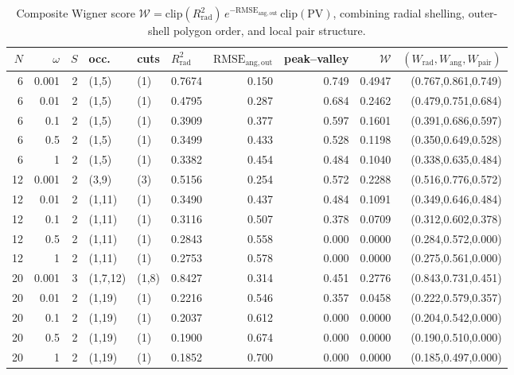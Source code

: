 \begin{table}[t]
\centering
\small
\setlength{\tabcolsep}{3.5pt}
\renewcommand{\arraystretch}{1.12}
\begin{adjustbox}{max width=\textwidth}
\begin{tabular}{rrrlllrrrr}
\toprule
$N$ & $\omega$ & $S$ & occ. & cuts & $R^2_{\mathrm{rad}}$ & $\mathrm{RMSE}_{\mathrm{ang,out}}$ & peak--valley & $\mathcal{W}$ & $(W_{\mathrm{rad}},W_{\mathrm{ang}},W_{\mathrm{pair}})$ \\
\midrule
6 & 0.001 & 2 & (1,5) & (1) & 0.7674 & 0.150 & 0.749 & 0.4947 & (0.767,0.861,0.749) \\
6 & 0.01 & 2 & (1,5) & (1) & 0.4795 & 0.287 & 0.684 & 0.2462 & (0.479,0.751,0.684) \\
6 & 0.1 & 2 & (1,5) & (1) & 0.3909 & 0.377 & 0.597 & 0.1601 & (0.391,0.686,0.597) \\
6 & 0.5 & 2 & (1,5) & (1) & 0.3499 & 0.433 & 0.528 & 0.1198 & (0.350,0.649,0.528) \\
6 & 1 & 2 & (1,5) & (1) & 0.3382 & 0.454 & 0.484 & 0.1040 & (0.338,0.635,0.484) \\
12 & 0.001 & 2 & (3,9) & (3) & 0.5156 & 0.254 & 0.572 & 0.2288 & (0.516,0.776,0.572) \\
12 & 0.01 & 2 & (1,11) & (1) & 0.3490 & 0.437 & 0.484 & 0.1091 & (0.349,0.646,0.484) \\
12 & 0.1 & 2 & (1,11) & (1) & 0.3116 & 0.507 & 0.378 & 0.0709 & (0.312,0.602,0.378) \\
12 & 0.5 & 2 & (1,11) & (1) & 0.2843 & 0.558 & 0.000 & 0.0000 & (0.284,0.572,0.000) \\
12 & 1 & 2 & (1,11) & (1) & 0.2753 & 0.578 & 0.000 & 0.0000 & (0.275,0.561,0.000) \\
20 & 0.001 & 3 & (1,7,12) & (1,8) & 0.8427 & 0.314 & 0.451 & 0.2776 & (0.843,0.731,0.451) \\
20 & 0.01 & 2 & (1,19) & (1) & 0.2216 & 0.546 & 0.357 & 0.0458 & (0.222,0.579,0.357) \\
20 & 0.1 & 2 & (1,19) & (1) & 0.2037 & 0.612 & 0.000 & 0.0000 & (0.204,0.542,0.000) \\
20 & 0.5 & 2 & (1,19) & (1) & 0.1900 & 0.674 & 0.000 & 0.0000 & (0.190,0.510,0.000) \\
20 & 1 & 2 & (1,19) & (1) & 0.1852 & 0.700 & 0.000 & 0.0000 & (0.185,0.497,0.000) \\
\bottomrule
\end{tabular}
\end{adjustbox}
\caption{Composite Wigner score $\mathcal{W}=\mathrm{clip}(R^2_{\mathrm{rad}})\,e^{-\mathrm{RMSE}_{\mathrm{ang,out}}}\,\mathrm{clip}(\mathrm{PV})$, combining radial shelling, outer-shell polygon order, and local pair structure.}
\label{tab:wigner_score}
\end{table}
